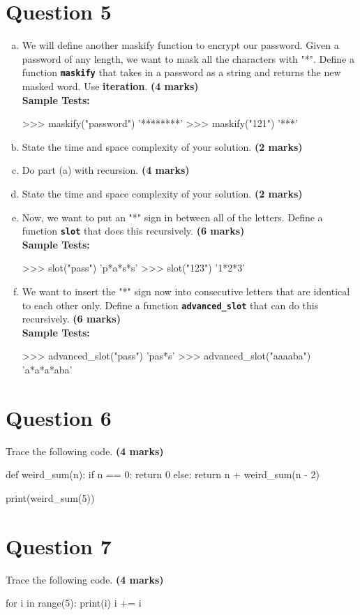 \section{Question 5}
\begin{enumerate}[(a)]
\item We will define another maskify function to encrypt our password. Given a password
of any length, we want to mask all the characters with "*". Define a function \texttt{\bfseries maskify}
that takes in a password as a string and returns the new masked word. Use \textbf{iteration}. \textbf{(4 marks)} \\
\textbf{Sample Tests:}
\begin{python}
>>> maskify("password")
'********'
>>> maskify("121")
'***'
\end{python}

\item State the time and space complexity of your solution. \textbf{(2 marks)}

\item Do part (a) with recursion. \textbf{(4 marks)}

\item State the time and space complexity of your solution. \textbf{(2 marks)}

\item Now, we want to put an "*" sign in between all of the letters. Define a function \texttt{\bfseries slot}
that does this recursively. \textbf{(6 marks)} \\
\textbf{Sample Tests:}
\begin{python}
>>> slot("pass")
'p*a*s*s'
>>> slot("123")
'1*2*3'
\end{python}

\item We want to insert the "*" sign now into consecutive letters that are identical to each
other only. Define a function \texttt{\bfseries advanced\_slot} that can do this recursively. \textbf{(6 marks)} \\
\textbf{Sample Tests:}
\begin{python}
>>> advanced_slot("pass")
'pas*s'
>>> advanced_slot("aaaaba")
'a*a*a*aba'
\end{python}
\end{enumerate}

\newpage

\section{Question 6}
Trace the following code. \textbf{(4 marks)}
\begin{python}
def weird_sum(n):
    if n == 0:
        return 0 
    else:
        return n + weird_sum(n - 2)

print(weird_sum(5))
\end{python}

\section{Question 7}
Trace the following code. \textbf{(4 marks)}
\begin{python}
for i in range(5):
    print(i)
    i += i
\end{python}

